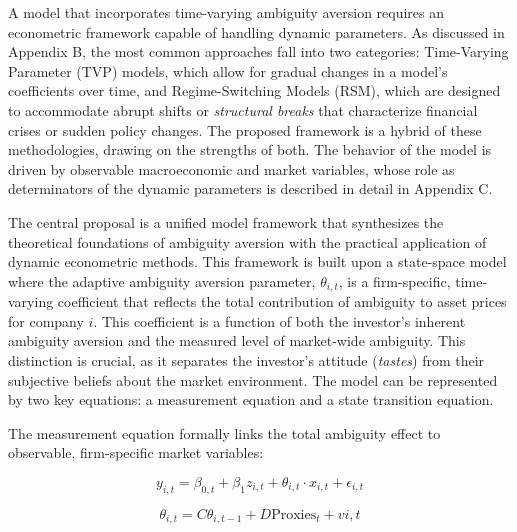 \documentclass[preprint,12pt,authoryear]{elsarticle}
\begin{document}
A model that incorporates time-varying ambiguity aversion requires an econometric framework capable of handling dynamic parameters. As discussed in Appendix B, the most common approaches fall into two categories: Time-Varying Parameter (TVP) models, which allow for gradual changes in a model's coefficients over time, and Regime-Switching Models (RSM), which are designed to accommodate abrupt shifts or \textit{structural breaks} that characterize financial crises or sudden policy changes. The proposed framework is a hybrid of these methodologies, drawing on the strengths of both. The behavior of the model is driven by observable macroeconomic and market variables, whose role as determinators of the dynamic parameters is described in detail in Appendix C.

The central proposal is a unified model framework that synthesizes the theoretical foundations of ambiguity aversion with the practical application of dynamic econometric methods. This framework is built upon a state-space model where the adaptive ambiguity aversion parameter, $\theta_{i,t}$, is a firm-specific, time-varying coefficient that reflects the total contribution of ambiguity to asset prices for company $i$. This coefficient is a function of both the investor's inherent ambiguity aversion and the measured level of market-wide ambiguity. This distinction is crucial, as it separates the investor's attitude (\textit{tastes}) from their subjective beliefs about the market environment. The model can be represented by two key equations: a measurement equation and a state transition equation. 

The measurement equation formally links the total ambiguity effect to observable, firm-specific market variables:

\begin{equation}
y_{i,t} = \beta_{0,t} + \beta_1 z_{i,t} + \theta_{i,t} \cdot x_{i,t} + \epsilon_{i,t}
\end{equation}

\begin{equation}
\theta_{i,t} = C\theta_{i,t-1} + D\text{Proxies}_t + v{i,t}
\end{equation}
\end{document}
